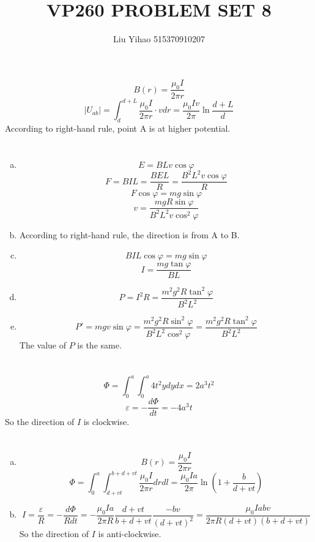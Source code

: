 \documentclass{article}
\title{VP260 PROBLEM SET 8}
\author{Liu Yihao 515370910207}
\date{}
\begin{document}
\maketitle

\section{}
$$B(r)=\frac{\mu_0 I}{2\pi r}$$
$$|U_{ab}|=\int_d^{d+L}\frac{\mu_0 I}{2\pi r}\cdot vdr=\frac{\mu_0 Iv}{2\pi}\ln\frac{d+L}{d}$$
According to right-hand rule, point A is at higher potential.

\section{}
\begin{enumerate}[(a)]
\item
$$E=BLv\cos\varphi$$
$$F=BIL=\frac{BEL}{R}=\frac{B^2L^2v\cos\varphi}{R}$$
$$F\cos\varphi=mg\sin\varphi$$
$$v=\frac{mgR\sin\varphi}{B^2L^2v\cos^2\varphi}$$
\item
According to right-hand rule, the direction is from A to B.
\item
$$BIL\cos\varphi=mg\sin\varphi$$
$$I=\frac{mg\tan\varphi}{BL}$$
\item
$$P=I^2R=\frac{m^2g^2R\tan^2\varphi}{B^2L^2}$$
\item
$$P'=mgv\sin\varphi=\frac{m^2g^2R\sin^2\varphi}{B^2L^2\cos^2\varphi}=\frac{m^2g^2R\tan^2\varphi}{B^2L^2}$$
The value of $P$ is the same.
\end{enumerate}

\section{}
$$\Phi=\int_0^a\int_0^a4t^2ydydx=2a^3t^2$$
$$\varepsilon=-\frac{d\Phi}{dt}=-4a^3t$$
So the direction of $I$ is clockwise.

\section{}
\begin{enumerate}[(a)]
\item
$$B(r)=\frac{\mu_0 I}{2\pi r}$$
$$\Phi=\int_0^a\int_{d+vt}^{b+d+vt}\frac{\mu_0 I}{2\pi r}drdl=\frac{\mu_0 Ia}{2\pi}\ln\left(1+\frac{b}{d+vt}\right)$$
\item
$$I=\frac{\varepsilon}{R}=-\frac{d\Phi}{Rdt}=-\frac{\mu_0 Ia}{2\pi R}\frac{d+vt}{b+d+vt}\frac{-bv}{(d+vt)^2}=\frac{\mu_0 Iabv}{2\pi R(d+vt)(b+d+vt)}$$
So the direction of $I$ is anti-clockwise.
\end{enumerate}
\end{document}

